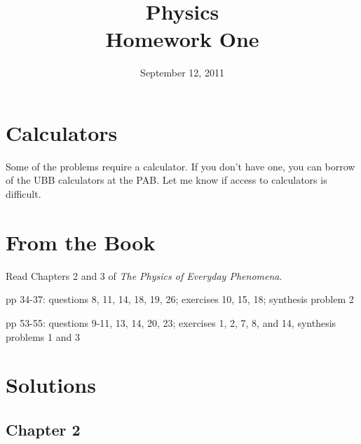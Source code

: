 \documentclass{exam}
\title{Physics \\ Homework One}
\date{September 12, 2011}
\begin{document}
\maketitle

\ifprintanswers
\else
\section{Calculators}

Some of the problems require a calculator.  If you don't have one, you can borrow of the UBB
calculators at the PAB.  Let me know if access to calculators is difficult.

\fi

\section{From the Book}

\begin{itemize*}
  \item Read Chapters 2 and 3 of {\em The Physics of Everyday Phenomena}.
  \item pp 34-37: questions 8, 11, 14, 18, 19, 26; exercises 10, 15, 18; synthesis problem 2
  \item pp 53-55: questions 9-11, 13, 14, 20, 23; exercises 1, 2, 7, 8, and 14, synthesis problems 1 and 3
\end{itemize*}

\ifprintanswers
\section{Solutions}

\subsection{Chapter 2}
\end{document}

